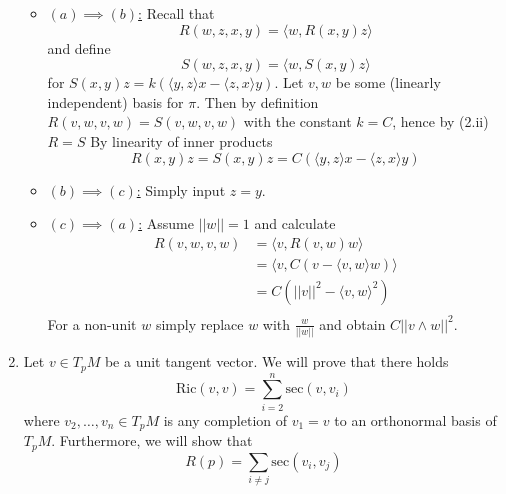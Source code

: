 \documentclass[a4paper, 12pt]{article}
\begin{document}
\begin{Exercise}
\begin{enumerate}[label=(\roman*)]
\begin{enumerate}[label=(\alph*)]
            \end{enumerate}
            \begin{itemize}
                \item \underline{$(a)\implies(b)$:}
                    Recall that
                    \[
                        R(w, z, x, y) = \langle w, R(x, y)z\rangle
                    \]
                    and define
                    \[
                        S(w, z, x, y) = \langle w, S(x, y)z\rangle
                    \]
                    for $S(x, y)z = k(\langle y, z\rangle x - \langle z, x\rangle y)$.
                    Let $v, w$ be some (linearly independent) basis for $\pi$.
                    Then by definition $R(v, w, v, w) = S(v, w, v, w)$ with the constant $k = C$,
                    hence by (2.ii) $R = S$
                    By linearity of inner products
                    \[
                        R(x, y)z = S(x, y)z = C(\langle y, z\rangle x - \langle z, x \rangle y)
                    \]
                \item \underline{$(b)\implies(c)$:}
                    Simply input $z = y$.
                \item \underline{$(c)\implies(a)$:}
                    Assume $||w|| = 1$ and calculate
                    \begin{align*}
                        R(v, w, v, w)
                        &= \langle v, R(v, w)w\rangle \\
                        &= \langle v, C(v - \langle v, w\rangle w)\rangle \\
                        &= C(||v||^2 - \langle v, w \rangle^2) \\
                    \end{align*}
                    For a non-unit $w$ simply replace $w$ with $\frac{w}{||w||}$
                    and obtain $C||v\wedge w||^2$.
            \end{itemize}
        \item Let $v \in T_pM$ be a unit tangent vector.
            We will prove that there holds
            \[
                \text{Ric}(v, v) = \sum_{i=2}^{n}\text{sec}(v, v_i)
            \]
            where $v_2,\dots,v_n \in T_pM$ is any completion of $v_1 = v$ to an orthonormal basis of $T_pM$.
            Furthermore, we will show that
            \[
                R(p) = \sum_{i\neq j} \text{sec}(v_i,v_j)
            \]


\end{enumerate}
\end{Exercise}
\end{document}
